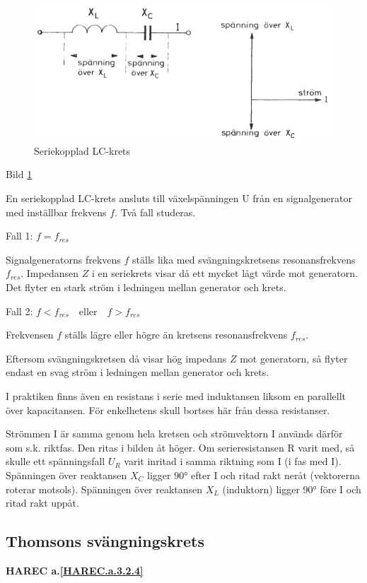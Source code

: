 \begin{figure}
\includegraphics[width=\textwidth]{images/cropped_pdfs/bild_2_3-16.pdf}
\caption{Seriekopplad LC-krets}
\label{fig:BildII3-16}
\end{figure}

Bild \ref{fig:BildII3-16}

En seriekopplad LC-krets ansluts till växelspänningen U från en signalgenerator
med inställbar frekvens \(f\). Två fall studeras.

Fall 1: \(f = f_{res}\)

Signalgeneratorns frekvens \(f\) ställs lika med svängningskretsens
resonansfrekvens \(f_{res}\). Impedansen \(Z\) i en seriekrets visar då ett
mycket lågt värde mot generatorn. Det flyter en stark ström i ledningen mellan
generator och krets.

Fall 2: \(f < f_{res} \quad \text{eller} \quad f > f_{res}\)

Frekvensen \(f\) ställs lägre eller högre än kretsens resonansfrekvens
\(f_{res}\).

Eftersom svängningskretsen då visar hög impedans \(Z\) mot generatorn, så
flyter endast en svag ström i ledningen mellan generator och krets.

I praktiken finns även en resistans i serie med induktansen liksom en
parallellt över kapacitansen. För enkelhetens skull bortses här från dessa
resistanser.

Strömmen I är samma genom hela kretsen och strömvektorn I används därför som
s.k. riktfas. Den ritas i bilden åt höger. Om serieresistansen R varit med, så
skulle ett spänningsfall \(U_R\) varit inritad i samma riktning som I
(i fas med I). Spänningen över reaktansen \(X_C\) ligger 90° efter I och ritad
rakt neråt (vektorerna roterar motsols). Spänningen över reaktansen \(X_L\)
(induktorn) ligger 90° före I och ritad rakt uppåt.

\subsection{Thomsons svängningskrets}
\textbf{HAREC a.\ref{HAREC.a.3.2.4}\label{myHAREC.a.3.2.4}}

